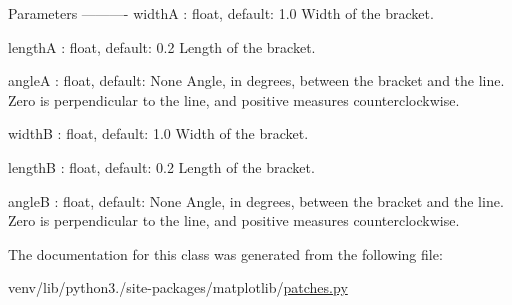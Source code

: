 \begin{DoxyVerb}Parameters
----------
widthA : float, default: 1.0
    Width of the bracket.

lengthA : float, default: 0.2
    Length of the bracket.

angleA : float, default: None
    Angle, in degrees, between the bracket and the line. Zero is
    perpendicular to the line, and positive measures
    counterclockwise.

widthB : float, default: 1.0
    Width of the bracket.

lengthB : float, default: 0.2
    Length of the bracket.

angleB : float, default: None
    Angle, in degrees, between the bracket and the line. Zero is
    perpendicular to the line, and positive measures
    counterclockwise.
\end{DoxyVerb}
 

The documentation for this class was generated from the following file\+:\begin{DoxyCompactItemize}
\item 
venv/lib/python3./site-\/packages/matplotlib/\hyperlink{patches_8py}{patches.\+py}\end{DoxyCompactItemize}

